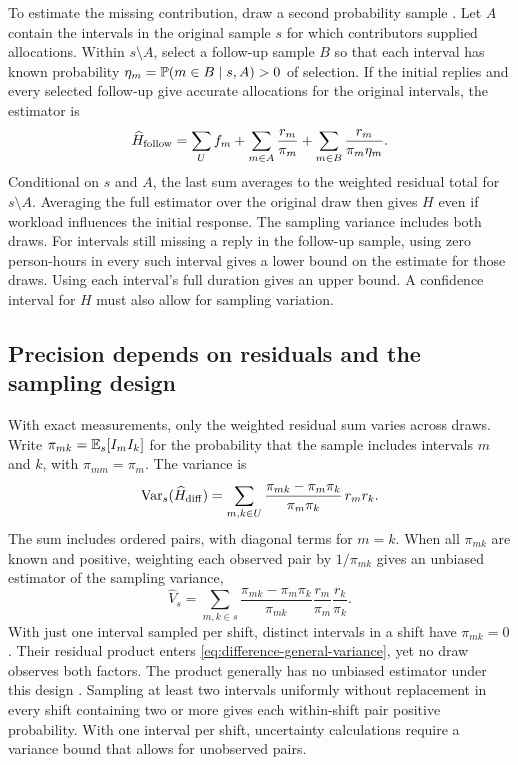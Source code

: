 To estimate the missing contribution, draw a second probability sample \cite{nonresponsefollowup}. Let $A$ contain the intervals in the original sample $s$ for which contributors supplied allocations. Within $s\setminus A$, select a follow-up sample $B$ so that each interval has known probability $\eta_m=\mathbb P(m\in B\mid s,A)>0$ of selection. If the initial replies and every selected follow-up give accurate allocations for the original intervals, the estimator is
\begin{equation}
 \widehat H_{\rm follow}
 =\sum_U f_m+\sum_{m\in A}\frac{r_m}{\pi_m}
             +\sum_{m\in B}\frac{r_m}{\pi_m\eta_m}.
 \label{eq:followup}
\end{equation}
Conditional on $s$ and $A$, the last sum averages to the weighted residual total for $s\setminus A$. Averaging the full estimator over the original draw then gives $H$ even if workload influences the initial response. The sampling variance includes both draws. For intervals still missing a reply in the follow-up sample, using zero person-hours in every such interval gives a lower bound on the estimate for those draws. Using each interval's full duration gives an upper bound. A confidence interval for $H$ must also allow for sampling variation.

\subsection{Precision depends on residuals and the sampling design}
\label{sec:difference-variance}

With exact measurements, only the weighted residual sum varies across draws. Write $\pi_{mk}=\mathbb E_s[I_m I_k]$ for the probability that the sample includes intervals $m$ and $k$, with $\pi_{mm}=\pi_m$. The variance is
\begin{equation}
 \operatorname{Var}_s(\widehat H_{\mathrm{diff}})
 =\sum_{m,k\in U}
 \frac{\pi_{mk}-\pi_m\pi_k}{\pi_m\pi_k}\,r_mr_k.
 \label{eq:difference-general-variance}
\end{equation}
The sum includes ordered pairs, with diagonal terms for $m=k$. When all $\pi_{mk}$ are known and positive, weighting each observed pair by $1/\pi_{mk}$ gives an unbiased estimator of the sampling variance,
\begin{equation}
 \widehat V_s
 =\sum_{m,k\in s}\frac{\pi_{mk}-\pi_m\pi_k}{\pi_{mk}}
             \frac{r_m}{\pi_m}\frac{r_k}{\pi_k}.
 \label{eq:design-variance-estimate}
\end{equation}
With just one interval sampled per shift, distinct intervals in a shift have $\pi_{mk}=0$. Their residual product enters \eqref{eq:difference-general-variance}, yet no draw observes both factors. The product generally has no unbiased estimator under this design \cite{aronow2013}. Sampling at least two intervals uniformly without replacement in every shift containing two or more gives each within-shift pair positive probability. With one interval per shift, uncertainty calculations require a variance bound that allows for unobserved pairs.

